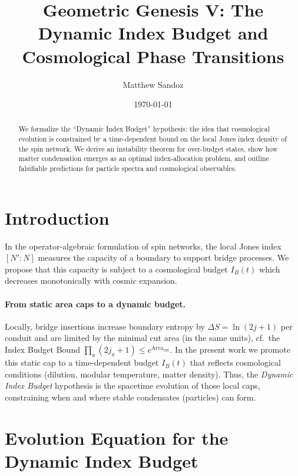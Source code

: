 \documentclass[11pt]{article}
\title{Geometric Genesis V: The Dynamic Index Budget and Cosmological Phase Transitions}
\author{Matthew Sandoz}
\date{\today}
\theoremstyle{plain}
\theoremstyle{definition}
\begin{document}
\maketitle
\begin{abstract}
  We formalize the ``Dynamic Index Budget'' hypothesis: the idea that cosmological evolution is constrained by a time-dependent bound on the local Jones index density of the spin network. We derive an instability theorem for over-budget states, show how matter condensation emerges as an optimal index-allocation problem, and outline falsifiable predictions for particle spectra and cosmological observables.
\end{abstract}

\section{Introduction}
In the operator-algebraic formulation of spin networks, the local Jones index $[N':N]$ measures the capacity of a boundary to support bridge processes. We propose that this capacity is subject to a cosmological budget $I_B(t)$ which decreases monotonically with cosmic expansion.

\paragraph{From static area caps to a dynamic budget.}
Locally, bridge insertions increase boundary entropy by $\Delta S=\ln(2j+1)$ per conduit and are limited by the minimal cut area (in the same units), cf.\ the Index Budget Bound $\prod_a(2j_a+1)\le e^{\mathrm{Area}_{\mathrm{cut}}}$.
In the present work we promote this static cap to a time-dependent budget $I_B(t)$ that reflects cosmological conditions (dilution, modular temperature, matter density). Thus, the \emph{Dynamic Index Budget} hypothesis is the spacetime evolution of those local caps, constraining when and where stable condensates (particles) can form.

\section{Evolution Equation for the Dynamic Index Budget}\label{sec:budget-evolution}
\end{document}
